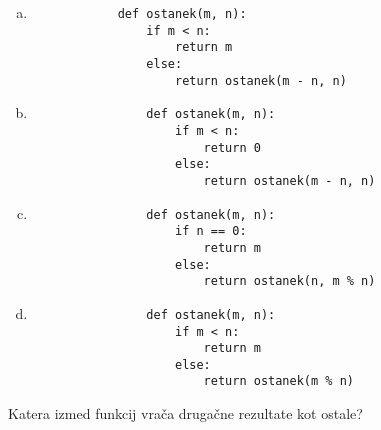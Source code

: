 \documentclass[arhiv, 10pt]{../izpit}
\begin{document}
        \begin{multicols}{2}
        \begin{enumerate}[(a)]
\item 
            \begin{verbatim}
            def ostanek(m, n):
                if m < n:
                    return m
                else:
                    return ostanek(m - n, n)
            \end{verbatim}
        
\item 
                \begin{verbatim}
                def ostanek(m, n):
                    if m < n:
                        return 0
                    else:
                        return ostanek(m - n, n)
                \end{verbatim}
            
\item 
                \begin{verbatim}
                def ostanek(m, n):
                    if n == 0:
                        return m
                    else:
                        return ostanek(n, m % n)
                \end{verbatim}
            
\item 
                \begin{verbatim}
                def ostanek(m, n):
                    if m < n:
                        return m
                    else:
                        return ostanek(m % n)
                \end{verbatim}
            
\end{enumerate}

        \end{multicols}
    
        \naloga*
        
        Katera izmed funkcij vrača drugačne rezultate kot ostale?
    
\end{document}
